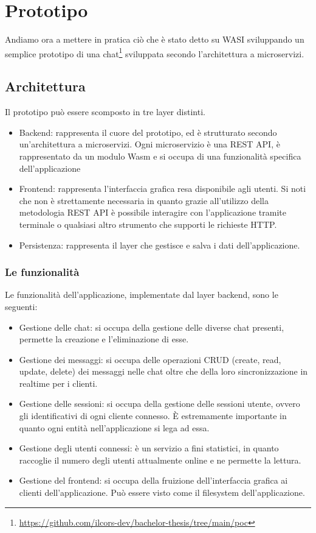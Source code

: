 \chapter{Prototipo}
Andiamo ora a mettere in pratica ciò che è stato detto su WASI sviluppando un semplice prototipo di una
chat\footnote{\url{https://github.com/ilcors-dev/bachelor-thesis/tree/main/poc}} sviluppata secondo l'architettura a
microservizi.

\section{Architettura}
Il prototipo può essere scomposto in tre layer distinti.

\begin{itemize}
    \item Backend: rappresenta il cuore del prototipo, ed è strutturato secondo un'architettura a microservizi. Ogni
    microservizio è una REST API, è rappresentato da un modulo Wasm e si occupa di una funzionalità specifica
    dell'applicazione
    \item Frontend: rappresenta l'interfaccia grafica resa disponibile agli utenti. Si noti che non è strettamente
    necessaria in quanto grazie all'utilizzo della metodologia REST API è possibile interagire con l'applicazione
    tramite terminale o qualsiasi altro strumento che supporti le richieste HTTP.
    \item Persistenza: rappresenta il layer che gestisce e salva i dati dell'applicazione.
\end{itemize}

\subsection{Le funzionalità}
Le funzionalità dell'applicazione, implementate dal layer backend, sono le seguenti:
\begin{itemize}
    \item Gestione delle chat: si occupa della gestione delle diverse chat presenti, permette la creazione e
    l'eliminazione di esse.
    \item Gestione dei messaggi: si occupa delle operazioni CRUD (create, read, update, delete) dei messaggi nelle chat
    oltre che della loro sincronizzazione in realtime per i clienti.
    \item Gestione delle sessioni: si occupa della gestione delle sessioni utente, ovvero gli identificativi di ogni
    cliente connesso. È estremamente importante in quanto ogni entità nell'applicazione si lega ad essa.
    \item Gestione degli utenti connessi: è un servizio a fini statistici, in quanto raccoglie il numero degli utenti
    attualmente online e ne permette la lettura.
    \item Gestione del frontend: si occupa della fruizione dell'interfaccia grafica ai clienti dell'applicazione. Può
    essere visto come il filesystem dell'applicazione.
\end{itemize}

